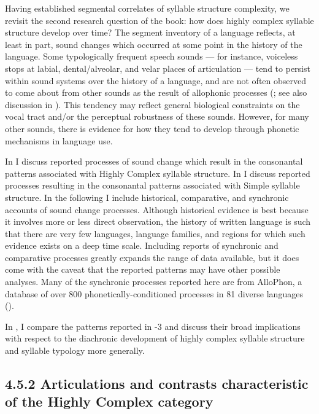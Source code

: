   Having established segmental correlates of syllable structure complexity, we revisit the second research question of the book: how does highly complex syllable structure develop over time? The segment inventory of a language reflects, at least in part, sound changes which occurred at some point in the history of the language. Some typologically frequent speech sounds — for instance, voiceless stops at labial, dental/alveolar, and velar places of articulation — tend to persist within sound systems over the history of a language, and are not often observed to come about from other sounds as the result of allophonic processes (\citealt{Bybee2015a}; see also discussion in ). This tendency may reflect general biological constraints on the vocal tract and/or the perceptual robustness of these sounds. However, for many other sounds, there is evidence for how they tend to develop through phonetic mechanisms in language use. 

  In  I discuss reported processes of sound change which result in the consonantal patterns associated with Highly Complex syllable structure. In  I discuss reported processes resulting in the consonantal patterns associated with Simple syllable structure. In the following I include historical, comparative, and synchronic accounts of sound change processes. Although historical evidence is best because it involves more or less direct observation, the history of written language is such that there are very few languages, language families, and regions for which such evidence exists on a deep time scale. Including reports of synchronic and comparative processes greatly expands the range of data available, but it does come with the caveat that the reported patterns may have other possible analyses. Many of the synchronic processes reported here are from AlloPhon, a database of over 800 phonetically-conditioned processes in 81 diverse languages (\citealt{BybeeEasterday2019}).

  In , I compare the patterns reported in -3 and discuss their broad implications with respect to the diachronic development of highly complex syllable structure and syllable typology more generally.

\subsection{4.5.2 Articulations and contrasts characteristic of the Highly Complex category} 


